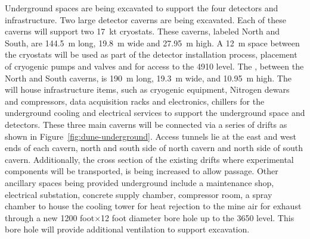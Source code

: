 Underground spaces are being excavated to support the four
 detectors and infrastructure.  Two large detector caverns
are being excavated.  Each of these caverns will support two
\SI{17}{\kilo\tonne} cryostats.  These caverns, labeled North and
South, are \SI{144.5}{\meter} long, \SI{19.8}{\meter} wide and
\SI{27.95}{\meter} high.  A \SI{12}{\meter} space between the
cryostats will be used as part of the detector installation process,
placement of cryogenic pumps and valves and for access to the 4910
level.  The , between the North and South caverns, is
\SI{190}{\meter} long, \SI{19.3}{\meter} wide, and \SI{10.95}{\meter}
high.  The  will house infrastructure items, such as
cryogenic equipment, Nitrogen dewars and compressors, data acquisition
racks and electronics, chillers for the underground cooling and
electrical services to support the underground space and detectors.
These three main caverns will be connected via a series of drifts as
shown in Figure~\ref{fig:dune-underground}. Access tunnels lie at the
east and west ends of each cavern, north and south side of north
cavern and north side of south cavern. Additionally, the cross section
of the existing drifts where experimental components will be
transported, is being increased to allow passage.  Other ancillary
spaces being provided underground include a maintenance shop,
electrical substation, concrete supply chamber, compressor room, a
spray chamber to house the cooling tower for heat rejection to the
mine air for exhaust through a new 1200 foot$\times$12 foot diameter bore
hole up to the 3650 level.  This bore hole will provide
additional ventilation to support excavation.

